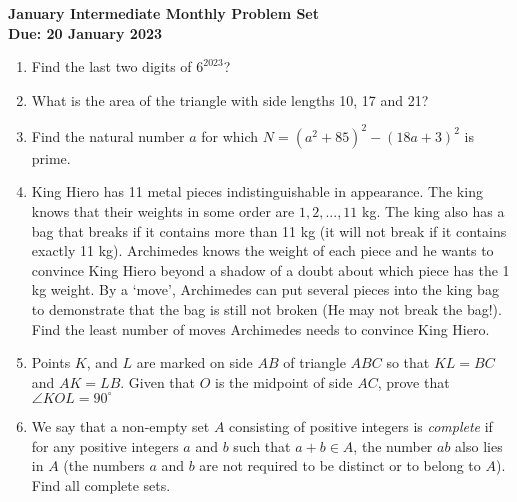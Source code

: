 \documentclass{article}
\begin{document}
\thispagestyle{empty}

\begin{center}
  \textbf{\Large January Intermediate Monthly Problem Set}
  \\ \vspace{1em}
  \textbf{\large Due: 20 January 2023}
\end{center}

\bigskip \bigskip

\begin{enumerate}[itemsep=\fill]

\item %
Find the last two digits of $6^{2023}$?
 
\item %
What is the area of the triangle with side lengths 10, 17 and 21?


\item %
Find the natural number $a$ for which $N = (a^{2} + 85)^{2} - (18a+3)^{2}$ is prime.


\item %
King Hiero has 11 metal pieces indistinguishable in appearance. The king knows that their weights in some order are $1,2,...,11$ kg. The king also has a bag that breaks if it contains more than 11 kg (it will not break if it contains exactly 11 kg). Archimedes knows the weight of each piece and he wants to convince King Hiero beyond a shadow of a doubt about which piece has the 1 kg weight. By a `move', Archimedes can put several pieces into the king bag to demonstrate that the bag is still not broken (He may not break the bag!). Find the least number of moves Archimedes needs to convince King Hiero. 


\item %
Points $K$, and $L$ are marked on side $AB$ of triangle $ABC$ so that $KL=BC$ and $AK=LB$. Given that $O$ is the midpoint of side $AC$, prove that $\angle{KOL} = 90^{\circ}$


\item %
We say that a non-empty set $A$ consisting of positive integers is \textit{complete} if for any positive integers $a$ and $b$ such that $a+b\in A$, the number $ab$ also lies in $A$ (the numbers $a$ and $b$ are not required to be distinct or to belong to $A$). Find all complete sets.

\end{enumerate}
\end{document}
